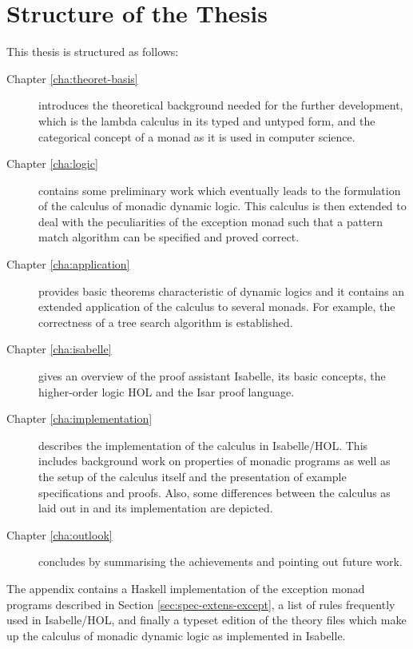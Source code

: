 \section{Structure of the Thesis}
\label{sec:structure-thesis}
This thesis is structured as follows:
\begin{description}
\item[Chapter \ref{cha:theoret-basis}] introduces the theoretical background
  needed for the further development, which is the lambda calculus in its typed
  and untyped form, and the
  categorical concept of a monad as it is used in computer science. 
\item[Chapter \ref{cha:logic}] contains some preliminary work which eventually
  leads to the formulation of the calculus of monadic dynamic logic. This
  calculus is then extended to deal with the peculiarities of the exception
  monad such that a pattern match algorithm can be specified and proved correct.
\item[Chapter \ref{cha:application}] provides basic theorems characteristic of
  dynamic logics and it contains an extended application of the calculus to
  several monads. For example, the correctness of a tree search algorithm is
  established.
\item[Chapter \ref{cha:isabelle}] gives an overview of the proof assistant
  Isabelle, its basic concepts, the higher-order logic HOL and the Isar proof
  language.
\item[Chapter \ref{cha:implementation}] describes the implementation of the
  calculus in Isabelle/HOL. This includes background work on properties of
  monadic programs as well as the setup of the calculus itself and the
  presentation of example specifications and proofs. Also, some differences
  between the calculus as laid out in \cite{SchroederMossakowski:PDL} and its
  implementation are depicted.
\item[Chapter \ref{cha:outlook}] concludes by summarising the achievements and
  pointing out future work.
\end{description}

The appendix contains a Haskell implementation of the exception monad programs
described in Section \ref{sec:spec-extens-except}, a list of rules frequently
used in Isabelle/HOL, and finally  a typeset edition of the theory files which
make up the calculus of monadic dynamic logic as implemented in Isabelle.

